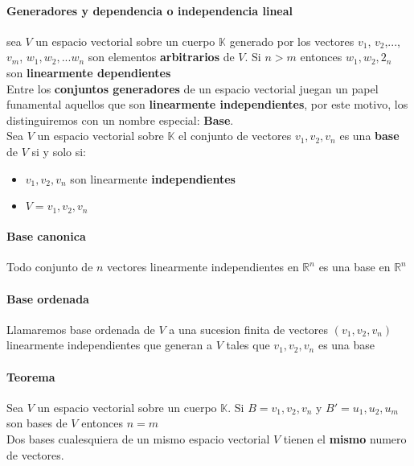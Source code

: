 \documentclass[10pt]{article}
\begin{document}
\paragraph{Generadores y dependencia o independencia lineal
}
sea $V$ un espacio vectorial sobre un cuerpo $\mathbb{K}$ generado por los vectores $v_1$, $v_2$,...,$v_m$, 
$w_1,w_2,...w_n$ son elementos \textbf{arbitrarios} de $V$. Si $n > m$ entonces $w_1, w_2, 2_n$ son \textbf{linearmente dependientes}\\
\linebreak
Entre los \textbf{conjuntos generadores} de un espacio vectorial juegan un papel funamental aquellos que son \textbf{linearmente independientes}, por este motivo, los distinguiremos con un nombre especial: \textbf{Base}.\\
\linebreak
Sea $V$ un espacio vectorial sobre $\mathbb{K}$ el conjunto de vectores ${v_1, v_2, v_n}$ es una \textbf{base} de $V$ si y solo si:
\begin{itemize}
	\item $v_1, v_2, v_n$ son linearmente \textbf{independientes}
	\item $V = {v_1, v_2, v_n}$
\end{itemize}

\paragraph{Base canonica}
Todo conjunto de $n$ vectores linearmente independientes en $\mathbb{R}^n$ es una base en $\mathbb{R}^n$

\paragraph{Base ordenada}
Llamaremos base ordenada de $V$ a una sucesion finita de vectores $(v_1, v_2, v_n)$ linearmente independientes que generan a $V$ tales que ${v_1,v_2,v_n}$ es una base
\paragraph{Teorema}
Sea $V$ un espacio vectorial sobre un cuerpo $\mathbb{K}$. Si $B = {v_1, v_2, v_n}$ y $B' = {u_1,u_2,u_m}$ son bases de $V$ entonces $n=m$\\
Dos bases cualesquiera de un mismo espacio vectorial $V$ tienen el \textbf{mismo} numero de vectores.
\end{document}
